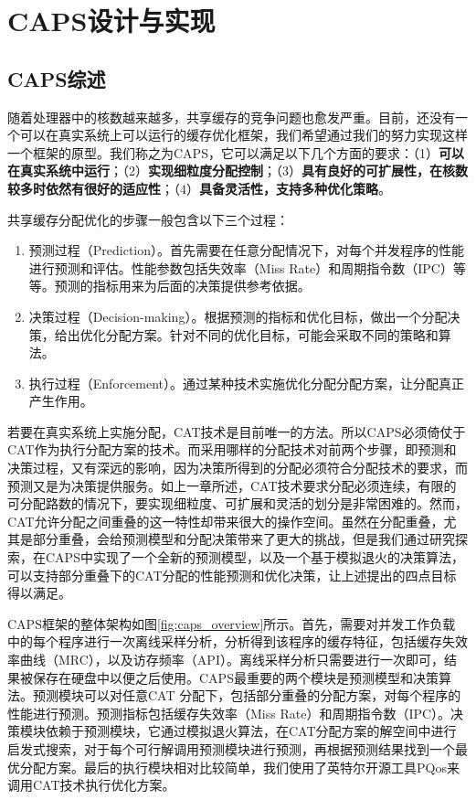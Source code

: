 
\chapter{CAPS设计与实现} \label{chap:design}
\section{CAPS综述}
随着处理器中的核数越来越多，共享缓存的竞争问题也愈发严重。目前，还没有一个可以在真实系统上可以运行的缓存优化框架，我们希望通过我们的努力实现这样一个框架的原型。我们称之为CAPS，它可以满足以下几个方面的要求：（1）\textbf{可以在真实系统中运行}；（2）\textbf{实现细粒度分配控制}；（3）\textbf{具有良好的可扩展性，在核数较多时依然有很好的适应性}；（4）\textbf{具备灵活性，支持多种优化策略}。

共享缓存分配优化的步骤一般包含以下三个过程：
\begin{enumerate}
\item 预测过程（Prediction）。首先需要在任意分配情况下，对每个并发程序的性能进行预测和评估。性能参数包括失效率（Miss Rate）和周期指令数（IPC）等等。预测的指标用来为后面的决策提供参考依据。
\item 决策过程（Decision-making）。根据预测的指标和优化目标，做出一个分配决策，给出优化分配方案。针对不同的优化目标，可能会采取不同的策略和算法。
\item 执行过程（Enforcement）。通过某种技术实施优化分配分配方案，让分配真正产生作用。
\end{enumerate}

若要在真实系统上实施分配，CAT技术是目前唯一的方法。所以CAPS必须倚仗于CAT作为执行分配方案的技术。而采用哪样的分配技术对前两个步骤，即预测和决策过程，又有深远的影响，因为决策所得到的分配必须符合分配技术的要求，而预测又是为决策提供服务。如上一章所述，CAT技术要求分配必须连续，有限的可分配路数的情况下，要实现细粒度、可扩展和灵活的划分是非常困难的。然而，CAT允许分配之间重叠的这一特性却带来很大的操作空间。虽然在分配重叠，尤其是部分重叠，会给预测模型和分配决策带来了更大的挑战，但是我们通过研究探索，在CAPS中实现了一个全新的预测模型，以及一个基于模拟退火的决策算法，可以支持部分重叠下的CAT分配的性能预测和优化决策，让上述提出的四点目标得以满足。

CAPS框架的整体架构如图\ref{fig:caps_overview}所示。首先，需要对并发工作负载中的每个程序进行一次离线采样分析，分析得到该程序的缓存特征，包括缓存失效率曲线（MRC），以及访存频率（API）。离线采样分析只需要进行一次即可，结果被保存在硬盘中以便之后使用。CAPS最重要的两个模块是预测模型和决策算法。预测模块可以对任意CAT 分配下，包括部分重叠的分配方案，对每个程序的性能进行预测。预测指标包括缓存失效率（Miss Rate）和周期指令数（IPC）。决策模块依赖于预测模块，它通过模拟退火算法，在CAT分配方案的解空间中进行启发式搜索，对于每个可行解调用预测模块进行预测，再根据预测结果找到一个最优分配方案。最后的执行模块相对比较简单，我们使用了英特尔开源工具PQos来调用CAT技术执行优化方案。


